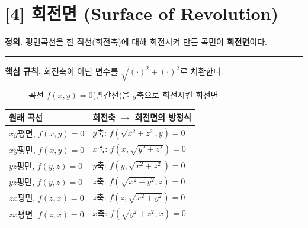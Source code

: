 \documentclass{article}
\theoremstyle{mystyle}
\begin{document}
\section*{[4] 회전면 (Surface of Revolution)}

\begin{tcolorbox}[
    colback=teal!4,
    colframe=teal!65!black,
    title=정의 \& 핵심 규칙,
    fonttitle=\bfseries,
    boxrule=0.5mm,
    arc=3mm
    ]
    \textbf{\textcolor{teal!65!black}{정의.}}\quad
    평면곡선을 한 직선(회전축)에 대해 회전시켜 만든 곡면이 \textbf{회전면}이다.

    \noindent\textcolor{teal!50!black}{\rule{\linewidth}{0.4pt}}

    \textbf{\textcolor{teal!65!black}{핵심 규칙.}}\quad
    회전축이 아닌 변수를 \(\sqrt{(\cdot)^2+(\cdot)^2}\)로 치환한다.
\end{tcolorbox}

\begin{figure}[h]
\centering
{}
\caption{곡선 $f(x,y)=0$(빨간선)을 $y$축으로 회전시킨 회전면}
\end{figure}


\begin{center}
\renewcommand{\arraystretch}{1.3}
\begin{tabular}{|l|l|}
\hline
원래 곡선 & 회전축 $\to$ 회전면의 방정식 \\
\hline
\(xy\)평면, \(f(x,y)=0\) & \(y\)축: \(f(\sqrt{x^2+z^2},y)=0\) \\
\hline
\(xy\)평면, \(f(x,y)=0\) & \(x\)축: \(f(x,\sqrt{y^2+z^2})=0\) \\
\hline
\(yz\)평면, \(f(y,z)=0\) & \(y\)축: \(f(y,\sqrt{x^2+z^2})=0\) \\
\hline
\(yz\)평면, \(f(y,z)=0\) & \(z\)축: \(f(\sqrt{x^2+y^2},z)=0\) \\
\hline
\(zx\)평면, \(f(z,x)=0\) & \(z\)축: \(f(z,\sqrt{x^2+y^2})=0\) \\
\hline
\(zx\)평면, \(f(z,x)=0\) & \(x\)축: \(f(\sqrt{y^2+z^2},x)=0\) \\
\hline
\end{tabular}
\end{center}
\end{document}
